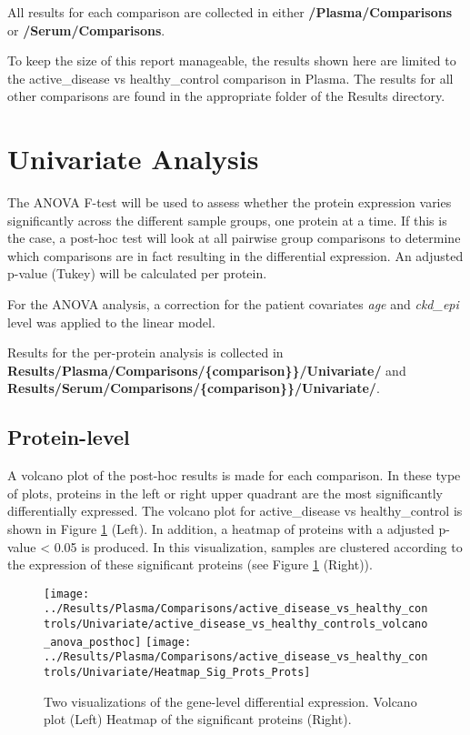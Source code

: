 \documentclass[
]{book}
\begin{document}
All results for each comparison are collected in either \textbf{/Plasma/Comparisons}
or \textbf{/Serum/Comparisons}.

To keep the size of this report manageable, the results shown here are limited to the
active\_disease vs healthy\_control comparison in Plasma. The results for all
other comparisons are found in the appropriate folder of the Results
directory.

\hypertarget{univariate-analysis}{%
\section{Univariate Analysis}\label{univariate-analysis}}

The ANOVA F-test will be used to assess whether the protein expression varies
significantly across the different sample groups, one protein at a time. If
this is the case, a post-hoc test will look at all pairwise group comparisons
to determine which comparisons are in fact resulting in the differential
expression. An adjusted p-value (Tukey) will be calculated per protein.

For the ANOVA analysis, a correction for the patient covariates \emph{age} and
\emph{ckd\_epi} level was applied to the linear model.

Results for the per-protein analysis is collected in \textbf{Results/Plasma/Comparisons/\{comparison\}\}/Univariate/} and \textbf{Results/Serum/Comparisons/\{comparison\}\}/Univariate/}.

\hypertarget{protein-level}{%
\subsection{Protein-level}\label{protein-level}}

A volcano plot of the post-hoc results is made for each comparison. In these type of plots, proteins in the left or right upper quadrant are the most significantly differentially expressed. The volcano plot for active\_disease vs healthy\_control is shown in Figure \ref{fig:glplots} (Left). In addition, a heatmap of proteins with a adjusted p-value \textless{} 0.05 is produced. In this visualization, samples are clustered according to the expression of these significant proteins (see Figure \ref{fig:glplots} (Right)).

\begin{figure}

{\centering \texttt{[image: ../Results/Plasma/Comparisons/active\_disease\_vs\_healthy\_controls/Univariate/active\_disease\_vs\_healthy\_controls\_volcano\_anova\_posthoc]} \texttt{[image: ../Results/Plasma/Comparisons/active\_disease\_vs\_healthy\_controls/Univariate/Heatmap\_Sig\_Prots\_Prots]} 

}

\caption{Two visualizations of the gene-level differential expression. Volcano plot (Left) Heatmap of the significant proteins (Right).}\label{fig:glplots}
\end{figure}
\end{document}

